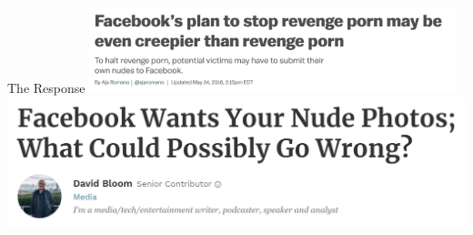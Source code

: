 \documentclass[nobackground,dvipsnames,table,aspectratio=169]{beamer}
\begin{document}
\begin{frame}{The Response}
    \centering
    \includegraphics[width=0.8\textwidth]{facebook-response-1}
    \includegraphics[width=\textwidth]{facebook-response-2}
\end{frame}
\end{document}
